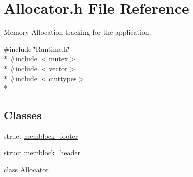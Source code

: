 \section{Allocator.\-h File Reference}
\label{_allocator_8h}


Memory Allocation tracking for the application.  


{\ttfamily \#include \char`\"{}Runtime.\-h\char`\"{}}\\*
{\ttfamily \#include $<$mutex$>$}\\*
{\ttfamily \#include $<$vector$>$}\\*
{\ttfamily \#include $<$cinttypes$>$}\\*
\subsection*{Classes}
\begin{DoxyCompactItemize}
\item 
struct \hyperlink{structmemblock__footer}{memblock\-\_\-footer}
\item 
struct \hyperlink{structmemblock__header}{memblock\-\_\-header}
\item 
class \hyperlink{class_allocator}{Allocator}
\end{DoxyCompactItemize}
